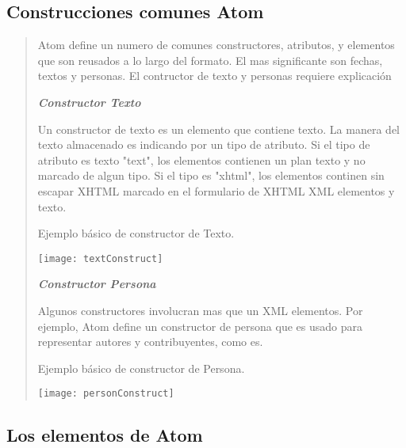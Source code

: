 \subsection{Construcciones comunes Atom}

\scriptsize

\blockquote{

Atom define un numero de comunes constructores, atributos, y elementos que son reusados a lo largo del formato.
El mas significante son fechas, textos y personas. El contructor de texto y personas requiere explicación


\textbf{\textit{Constructor Texto}}

Un constructor de texto es un elemento que contiene texto. La manera del texto almacenado es indicando
por un tipo de atributo. Si el tipo de atributo es texto "text", los elementos contienen un plan
texto y no marcado de algun tipo. Si el tipo es "xhtml", los elementos continen sin escapar XHTML marcado
en el formulario de XHTML XML elementos y texto.

\normalsize

Ejemplo b\'{a}sico de constructor de Texto.


\begin{minipage}[t]{0.4\textwidth}

\centering

\texttt{[image: textConstruct]}

\end{minipage}

\scriptsize

\textbf{\textit{Constructor Persona}}

Algunos constructores involucran mas que un XML elementos. Por ejemplo, Atom define un constructor de 
persona que es usado para representar autores y contribuyentes, como es.\cite{johnson2006rss}

\normalsize

Ejemplo b\'{a}sico de constructor de Persona.


\begin{minipage}{0.5\textwidth}
\centering
\texttt{[image: personConstruct]}
\end{minipage}

}

\subsection{Los elementos de Atom}


